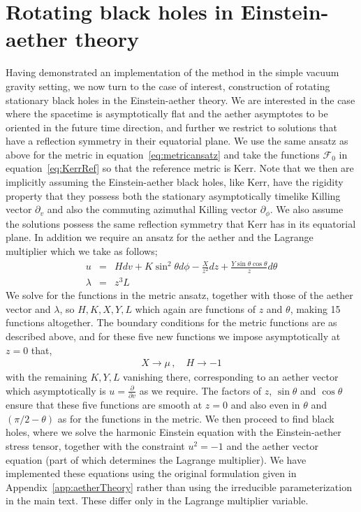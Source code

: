 \documentclass[12pt]{article}
\numberwithin{equation}{section}
\begin{document}

\section{Rotating black holes in Einstein-aether theory}
\label{sec:results}



Having demonstrated an implementation of the method in the simple vacuum gravity setting, we now turn to the case of interest,  construction of rotating stationary black holes in the Einstein-aether theory. 
We are interested in the case where the spacetime is asymptotically flat and the aether asymptotes to be oriented in the future time direction, and further we restrict to solutions that have a reflection symmetry in their equatorial plane.
We use the same ansatz as above for the metric in equation~\eqref{eq:metricansatz} and take the functions $\mathcal{F}_0$ in equation~\eqref{eq:KerrRef} so that the reference metric is Kerr. 
Note that we then are implicitly assuming the Einstein-aether black holes, like Kerr, have the rigidity property that they possess both the  stationary asymptotically timelike Killing vector $\partial_v$ and also the commuting azimuthal Killing vector $\partial_\phi$. We also assume the solutions possess the same reflection symmetry that Kerr has in its equatorial plane.
In addition we require an ansatz for the aether and the Lagrange multiplier which we take as follows;
\begin{eqnarray}
\label{eq:aetheransatz}
u & = & H dv + K \sin^2\theta d\phi - \frac{X}{z^2} dz + \frac{Y \sin\theta \cos\theta}{z} d\theta \\
\lambda & = & z^3 L
\end{eqnarray}
We solve for the functions in the metric ansatz, together with those of the aether vector and $\lambda$, so $H, K, X, Y, L$ 
which again are functions of $z$ and $\theta$, making 15 functions altogether. 
%
The boundary conditions for the metric functions are as described above, and for these five new functions we impose asymptotically at $z = 0$ that,
\begin{eqnarray}
X \to \mu \, , \quad H \to -1 
\end{eqnarray}
with the remaining $K, Y, L$ vanishing there, corresponding to an aether vector which asymptotically is $u = \frac{\partial}{\partial v}$ as we require. 
The factors of $z$, $\sin\theta$ and $\cos\theta$ ensure that these five functions are smooth at $z = 0$ and also even in $\theta$ and $(\pi/2 - \theta)$ as for the functions in the metric.
We then proceed to find black holes, where we solve the harmonic Einstein equation with the Einstein-aether stress tensor, together with the constraint $u^2 = -1$ and the aether vector equation (part of which determines the Lagrange multiplier). We have implemented these equations using the original formulation given in Appendix~\ref{app:aetherTheory} rather than using the irreducible parameterization in the main text. These differ only in the Lagrange multiplier variable.
\end{document}
